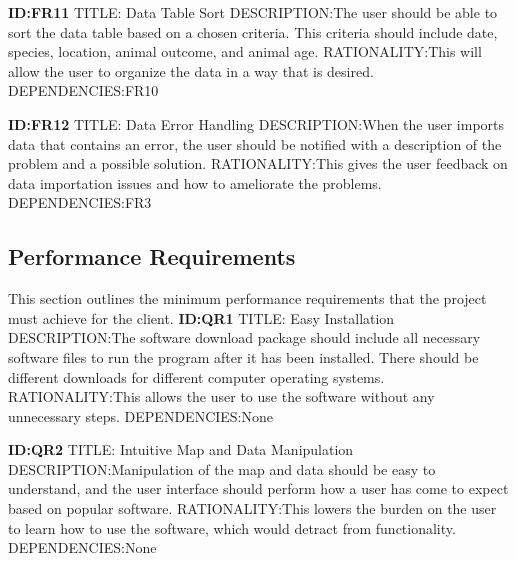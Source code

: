 \documentclass[onecolumn, draftclsnofoot,10pt, compsoc]{IEEEtran}
\begin{document}
\begin{singlespace}
    \textbf{ID:FR11}\newline
    TITLE: Data Table Sort\newline
    DESCRIPTION:The user should be able to sort the data table based on a chosen criteria.  This criteria should include date, species, location, animal outcome, and animal age.\newline
    RATIONALITY:This will allow the user to organize the data in a way that is desired.\newline
    DEPENDENCIES:FR10\newline

    \textbf{ID:FR12}\newline
    TITLE: Data Error Handling\newline
    DESCRIPTION:When the user imports data that contains an error, the user should be notified with a description of the problem and a possible solution.\newline
    RATIONALITY:This gives the user feedback on data importation issues and how to ameliorate the problems.\newline
    DEPENDENCIES:FR3\newline
    
\subsection{Performance Requirements}
This section outlines the minimum performance requirements that the project must achieve for the client.\newline\newline
    \textbf{ID:QR1}\newline
    TITLE: Easy Installation\newline
    DESCRIPTION:The software download package should include all necessary software files to run the program after it has been installed.  There should be different downloads for different computer operating systems.\newline
    RATIONALITY:This allows the user to use the software without any unnecessary steps.\newline
    DEPENDENCIES:None\newline

    \textbf{ID:QR2}\newline
    TITLE: Intuitive Map and Data Manipulation\newline
    DESCRIPTION:Manipulation of the map and data should be easy to understand, and the user interface should perform how a user has come to expect based on popular software.\newline
    RATIONALITY:This lowers the burden on the user to learn how to use the software, which would detract from functionality.\newline
    DEPENDENCIES:None\newline


\end{singlespace}
\end{document}
